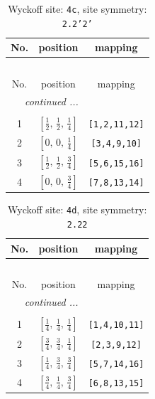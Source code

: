 \documentclass[fleqn,8pt]{jsarticle}
\begin{document}
\renewcommand{\arraystretch}{1.2}
\begin{longtable}{ccc}
\caption{Wyckoff site: {\tt 4c}, site symmetry: {\tt 2.2'2'}}
 \\
 \hline \hline
No. & position & mapping \\ \hline \endfirsthead

\multicolumn{2}{l}{\tablename\ \thetable{}} \\
 \hline \hline
No. & position & mapping \\ \hline \endhead

 \hline \hline
\multicolumn{2}{r}{\footnotesize\it continued ...} \\ \endfoot

 \hline \hline
\multicolumn{2}{r}{} \\ \endlastfoot

1 & $\left[ \frac{1}{2},\, \frac{1}{2},\, \frac{1}{4} \right]$ & {\tt [1,2,11,12]} \\ \hline
2 & $\left[ 0,\, 0,\, \frac{1}{4} \right]$ & {\tt [3,4,9,10]} \\ \hline
3 & $\left[ \frac{1}{2},\, \frac{1}{2},\, \frac{3}{4} \right]$ & {\tt [5,6,15,16]} \\ \hline
4 & $\left[ 0,\, 0,\, \frac{3}{4} \right]$ & {\tt [7,8,13,14]} \\
\end{longtable}
\renewcommand{\arraystretch}{1.2}
\begin{longtable}{ccc}
\caption{Wyckoff site: {\tt 4d}, site symmetry: {\tt 2.22}}
 \\
 \hline \hline
No. & position & mapping \\ \hline \endfirsthead

\multicolumn{2}{l}{\tablename\ \thetable{}} \\
 \hline \hline
No. & position & mapping \\ \hline \endhead

 \hline \hline
\multicolumn{2}{r}{\footnotesize\it continued ...} \\ \endfoot

 \hline \hline
\multicolumn{2}{r}{} \\ \endlastfoot

1 & $\left[ \frac{1}{4},\, \frac{1}{4},\, \frac{1}{4} \right]$ & {\tt [1,4,10,11]} \\ \hline
2 & $\left[ \frac{3}{4},\, \frac{3}{4},\, \frac{1}{4} \right]$ & {\tt [2,3,9,12]} \\ \hline
3 & $\left[ \frac{1}{4},\, \frac{3}{4},\, \frac{3}{4} \right]$ & {\tt [5,7,14,16]} \\ \hline
4 & $\left[ \frac{3}{4},\, \frac{1}{4},\, \frac{3}{4} \right]$ & {\tt [6,8,13,15]} \\
\end{longtable}
\end{document}
